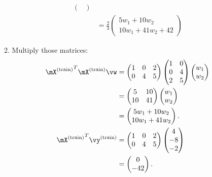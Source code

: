 \documentclass{article}
\newcommand{\utrain}{^{\textnormal{(train)}}}
\begin{document}
\begin{enumerate}
\begin{enumerate}
\begin{align*}
\begin{pmatrix}
                                            \end{pmatrix} \\
                              & = \frac23 \begin{pmatrix}
                                            5w_1 + 10w_2 \\ 
                                            10w_1 + 41w_2 + 42                       
                                            \end{pmatrix}
     \end{align*}
    \item Multiply those matrices: 
        \begin{align*}
            {\mX\utrain}^T\mX\utrain\vw & = 
            \begin{pmatrix}1&0&2\\0&4&5\end{pmatrix}
            \begin{pmatrix}1&0\\0&4\\2&5\end{pmatrix}
            \begin{pmatrix}w_1\\w_2\end{pmatrix} \\
                                      & = 
            \begin{pmatrix}5&10\\10&41\end{pmatrix}
            \begin{pmatrix}w_1\\w_2\end{pmatrix} \\
                                      & = 
             \begin{pmatrix}5w_1+10w_2\\10w_1+41w_2\end{pmatrix}. \\
            {\mX\utrain}^T\vy\utrain    & =
            \begin{pmatrix}1&0&2\\0&4&5\end{pmatrix}
            \begin{pmatrix}4\\-8\\-2\end{pmatrix} \\
                                      & = 
            \begin{pmatrix}0\\-42\end{pmatrix}. \\

\end{align*}
\end{enumerate}
\end{enumerate}
\end{document}
